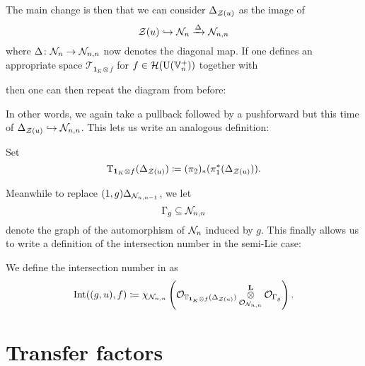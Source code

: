 The main change is then that we can consider $\Delta_{\mathcal Z(u)}$ as the image of
\[ \mathcal Z(u) \hookrightarrow \mathcal N_n \xrightarrow{\Delta} \mathcal N_{n,n} \]
where $\Delta \colon \mathcal N_n \to \mathcal N_{n,n}$ now denotes the diagonal map.
If one defines an appropriate space $\mathcal T_{\mathbf{1}_K \otimes f}$ for $f \in \mathcal H(\operatorname{U}(\mathbb V_n^+))$ together with
\begin{center}
\end{center}
then one can then repeat the diagram from before:
\begin{center}
\end{center}
In other words, we again take a pullback followed by a pushforward
but this time of $\Delta_{\mathcal Z(u)} \hookrightarrow \mathcal N_{n,n}$.
This lets us write an analogous definition:
\begin{definition}
  Set
  \[
    \mathbb T_{\mathbf{1}_K \otimes f} (\Delta_{\mathcal Z(u)})
    \coloneqq (\pi_2)_\ast(\pi_1^\ast(\Delta_{\mathcal Z(u)})).
  \]
\end{definition}
Meanwhile to replace $(1,g) \Delta_{\mathcal N_{n,n-1}}$, we let
\[ \Gamma_g \subseteq \mathcal N_{n,n} \]
denote the graph of the automorphism of $\mathcal N_n$ induced by $g$.
This finally allows us to write a definition of the intersection number in the semi-Lie case:
\begin{definition}
  We define the intersection number in  as
  \[
    \operatorname{Int}((g,u), f)
    \coloneqq \chi_{\mathcal N_{n,n}} \left(
      \mathcal{O}_{\mathbb T_{\mathbf{1}_K \otimes f}(\Delta_{\mathcal Z(u)})}
      \mathop{\otimes}^{\mathbf{L}}_{\mathcal{O}_{\mathcal N_{n,n}}} \mathcal{O}_{\Gamma_g} \right).
  \]
  \label{def:intersection_number_semi_lie_spherical}
\end{definition}

\section{Transfer factors}

